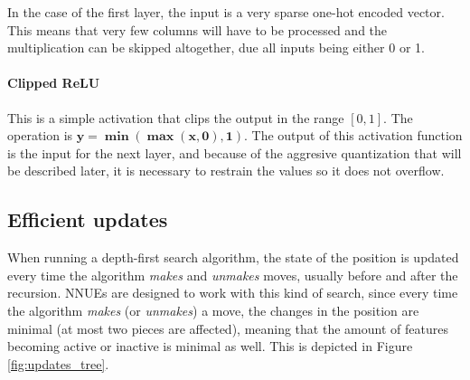 In the case of the first layer, the input is a very sparse one-hot encoded vector. This means that very few columns will have to be processed and the multiplication can be skipped altogether, due all inputs being either 0 or 1.

\paragraph[short]{Clipped ReLU} This is a simple activation that clips the output in the range $[0, 1]$. The operation is $\bm{y=\min(\max(x,0),1)}$.
The output of this activation function is the input for the next layer, and because of the aggresive quantization that will be described later, it is necessary to restrain the values so it does not overflow. \\

\subsection{Efficient updates}

When running a depth-first search algorithm, the state of the position is updated every time the algorithm \textit{makes} and \textit{unmakes} moves, usually before and after the recursion.
NNUEs are designed to work with this kind of search, since every time the algorithm \textit{makes} (or \textit{unmakes}) a move, the changes in the position are minimal (at most two pieces are affected), meaning that the amount of features becoming active or inactive is minimal as well. This is depicted in Figure \ref{fig:updates_tree}.

